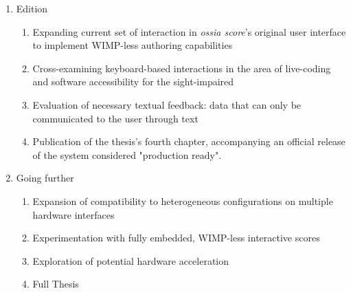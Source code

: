 \documentclass[journal,onecolumn]{IEEEtran}
\begin{document}
\begin{enumerate}
\begin{enumerate}
    \end{enumerate}
    \item Edition
    \begin{enumerate}
        \item Expanding current set of interaction in \textit{ossia score}'s original user interface to implement  WIMP-less authoring capabilities
        \item Cross-examining keyboard-based interactions in the area of live-coding and software accessibility for the sight-impaired
        \item Evaluation of necessary textual feedback: data that can only be communicated to the user through text
        \item Publication of the thesis's fourth chapter, accompanying an official release of the system considered "production ready".
    \end{enumerate}
    \item Going further
    \begin{enumerate}
        \item Expansion of compatibility to heterogeneous configurations on multiple hardware interfaces
        \item Experimentation with fully embedded, WIMP-less interactive scores
        \item Exploration of potential hardware acceleration
        \item Full Thesis
    \end{enumerate}
\end{enumerate}
\end{document}
